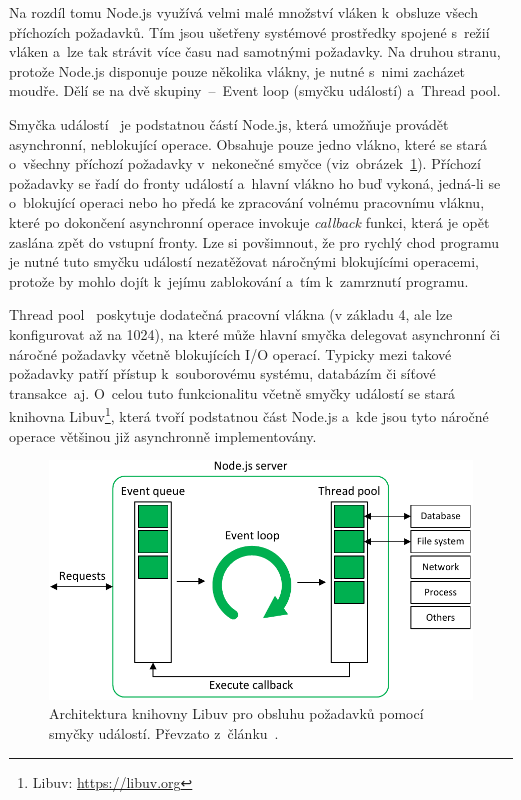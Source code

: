 Na rozdíl tomu Node.js využívá velmi malé množství vláken k~obsluze všech příchozích požadavků. Tím jsou ušetřeny systémové prostředky spojené s~režií vláken a~lze tak strávit více času nad samotnými požadavky. Na druhou stranu, protože Node.js disponuje pouze několika vlákny, je nutné s~nimi zacházet moudře. Dělí se na dvě skupiny~--~Event loop (smyčku událostí) a~Thread pool.

Smyčka událostí~\cite{website:TheNodeArchitecture} je podstatnou částí Node.js, která umožňuje provádět asynchronní, neblokující operace. Obsahuje pouze jedno vlákno, které se stará o~všechny příchozí požadavky v~nekonečné smyčce (viz~obrázek~\ref{img:Libuv architektura}). Příchozí požadavky se řadí do fronty událostí a~hlavní vlákno ho buď vykoná, jedná-li se o~blokující operaci nebo ho předá ke zpracování volnému pracovnímu vláknu, které po dokončení asynchronní operace invokuje \emph{callback} funkci, která je opět zaslána zpět do vstupní fronty. Lze si povšimnout, že pro rychlý chod programu je nutné tuto smyčku událostí nezatěžovat náročnými blokujícími operacemi, protože by mohlo dojít k~jejímu zablokování a~tím k~zamrznutí programu.

Thread pool~\cite{website:TheNodeArchitecture} poskytuje dodatečná pracovní vlákna (v základu 4, ale lze konfigurovat až na 1024), na které může hlavní smyčka delegovat asynchronní či náročné požadavky včetně blokujících I/O operací. Typicky mezi takové požadavky patří přístup k~souborovému systému, databázím či síťové transakce~aj. O~celou tuto funkcionalitu včetně smyčky událostí se stará knihovna Libuv\footnote{Libuv: \url{https://libuv.org}}, která tvoří podstatnou část Node.js a~kde jsou tyto náročné operace většinou již asynchronně implementovány.

\begin{figure}[hbt]
	\centering
	\setlength{\fboxsep}{0pt}
	\includegraphics[width=1.0\textwidth]{obrazky-figures/LibuvArchitecture.pdf}
	\caption{Architektura knihovny Libuv pro obsluhu požadavků pomocí smyčky událostí. Převzato z~článku~\cite{website:TheNodeArchitecture}.}
	\label{img:Libuv architektura}
\end{figure}

